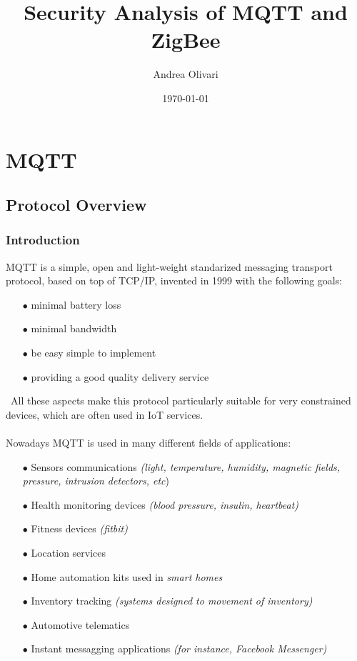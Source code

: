 \documentclass[12pt]{report}
\title{\textbf{Security Analysis of MQTT and ZigBee}}
\author{Andrea Olivari}
\date{\today}
\begin{document}
\maketitle
\tableofcontents{}

\part{MQTT}

\chapter{Protocol Overview}

\section{Introduction}
\bigskip
\textsc{MQTT} is a simple, open and light-weight standarized messaging transport protocol, based on top of TCP/IP, invented in 1999 with the following goals:


\begin{itemize}
\setlength{\itemindent}{+4mm}
  \item[$\bullet$] minimal battery loss
  \item[$\bullet$] minimal bandwidth
  \item[$\bullet$] be easy simple to implement
  \item[$\bullet$] providing a good quality delivery service
\end{itemize}\
All these aspects make this protocol particularly suitable for very constrained devices, which are often used in IoT services.\\\\
Nowadays MQTT is used in many different fields of applications:

 \begin{itemize}
 \setlength{\itemindent}{+4mm}
  \item[$\bullet$] Sensors communications \textit{(light, temperature, humidity, magnetic fields, pressure, intrusion detectors, etc})
  \item[$\bullet$] Health monitoring devices \textit{(blood pressure, insulin, heartbeat)}
  \item[$\bullet$] Fitness devices\textit{ (fitbit)}
  \item[$\bullet$] Location services
  \item[$\bullet$] Home automation kits used in \textit{smart homes}
  \item[$\bullet$] Inventory tracking \textit{(systems designed to movement of inventory)}
  \item[$\bullet$] Automotive telematics
  \item[$\bullet$] Instant messagging applications \textit{(for instance, Facebook Messenger)}
\end{itemize}\
\end{document}
